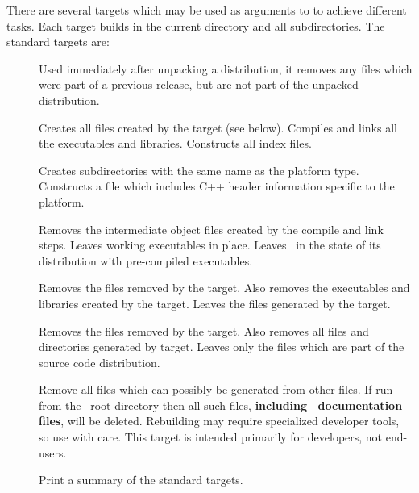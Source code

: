 There are several targets which may be used as arguments to
 to achieve different tasks.
Each target builds in the current directory
and all subdirectories.  The standard targets are:
\begin{description}
\item[]
Used immediately after unpacking a distribution, it removes
any files which were part of a previous release, but are not
part of the unpacked distribution.
\item[]
Creates all files created by the  target (see below).
Compiles and links all the executables and libraries.
Constructs all index files.
\item[]
Creates subdirectories with the same name as the platform type.
Constructs a  file which includes C++ header information
specific to the platform.
\item[]
Removes the intermediate object files created by the compile and
link steps.  Leaves working executables in place.  Leaves
\OOMMF\ in the state of its distribution with pre-compiled
executables.
\item[]
Removes the files removed by the  target.
Also removes the executables and libraries created by the 
target.  Leaves the files generated by the  target.
\item[]
Removes the files removed by the  target.
Also removes all files and directories generated by
 target.  Leaves only the files which
are part of the source code distribution.
\item[]
Remove all files which can possibly be generated from other files.  If
run from the \OOMMF\ root directory then all such files,
\textbf{including \OOMMF\ documentation files}, will be deleted.
Rebuilding may require specialized developer tools, so use with care.
This target is intended primarily for developers, not end-users.
\item[]
Print a summary of the standard targets.
\end{description}

